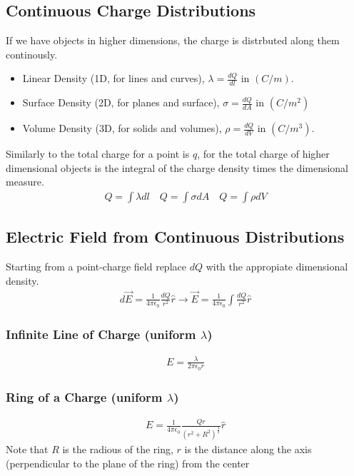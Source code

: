 \documentclass[12pt,twocolumn]{article}
\begin{document}
\subsection*{Continuous Charge Distributions}
If we have objects in higher dimensions, the charge is distrbuted along them
continously.
\begin{itemize}
  \item Linear Density (1D, for lines and curves), $\lambda= \frac{dQ}{dl}$ in $(C/m)$.
  \item Surface Density (2D, for planes and surface), $\sigma = \frac{dQ}{dA}$ in $(C/m^2)$
  \item Volume Density (3D, for solids and volumes), $\rho = \frac{dQ}{dV}$ in $(C/m^3)$.
\end{itemize}
Similarly to the total charge for a point is $q$, for the total charge of higher
dimensional objects is the integral of the charge density times the dimensional
measure.
\begin{align*}
  Q = \int \lambda dl \quad Q = \int \sigma dA \quad Q = \int \rho dV
\end{align*}
\subsection*{Electric Field from Continuous Distributions}
Starting from a point-charge field replace $dQ$ with the appropiate dimensional
density.
\begin{align*}
d\overrightarrow{E} = \frac{1}{4 \pi \epsilon_0} \frac{dQ}{r^2} \hat{r}
\rightarrow \overrightarrow{E} = \frac{1}{4 \pi \epsilon_0} \int \frac{dQ}{r^2} \hat{r}
\end{align*}
\subsubsection*{Infinite Line of Charge (uniform $\lambda$)}
\begin{align*}
  E = \frac {\lambda}{2\pi\epsilon_0r}
\end{align*}
\subsubsection*{Ring of a Charge (uniform $\lambda$)}
\begin{align*}
  E = \frac{1}{4\pi\epsilon_0} \frac{Qr}{(r^2+R^2)^{\frac{3}{2}}} \hat{r}
\end{align*}
Note that $R$ is the radious of the ring, $r$ is the distance along the axis
(perpendicular to the plane of the ring) from the center
\end{document}

